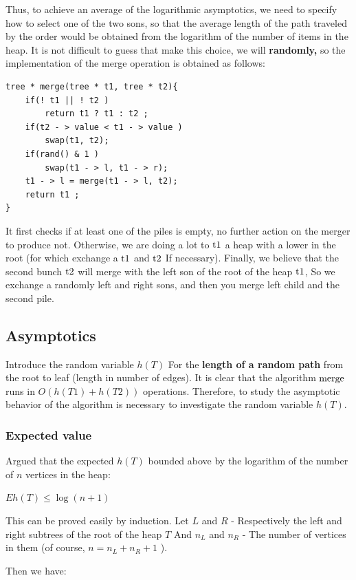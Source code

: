 Thus, to achieve an average of the logarithmic asymptotics, we need to specify how to select one of the two sons, so that the average length of the path traveled by the order would be obtained from the logarithm of the number of items in the heap. It is not difficult to guess that make this choice, we will \textbf{randomly,} so the implementation of the merge operation is obtained as follows:

\begin{verbatim}
tree * merge(tree * t1, tree * t2){
    if(! t1 || ! t2 )
        return t1 ? t1 : t2 ;
    if(t2 - > value < t1 - > value )
        swap(t1, t2);
    if(rand() & 1 )
        swap(t1 - > l, t1 - > r);
    t1 - > l = merge(t1 - > l, t2);
    return t1 ;
} 
\end{verbatim}
It first checks if at least one of the piles is empty, no further action on the merger to produce not. Otherwise, we are doing a lot to $\rm t1$ a heap with a lower in the root (for which exchange a $\rm t1$ and $\rm t2$ If necessary). Finally, we believe that the second bunch $\rm t2$ will merge with the left son of the root of the heap $\rm t1$, So we exchange a randomly left and right sons, and then you merge left child and the second pile.

\subsection{ Asymptotics }

Introduce the random variable $h (T)$ For the \textbf{length of a random path} from the root to leaf (length in number of edges). It is clear that the algorithm $\rm merge$ runs in $O (h (T1) + h (T2))$ operations. Therefore, to study the asymptotic behavior of the algorithm is necessary to investigate the random variable $h (T)$.

\subsubsection{ Expected value }

Argued that the expected $h (T)$ bounded above by the logarithm of the number of $n$ vertices in the heap:

$Eh (T) \le \log (n +1)$

This can be proved easily by induction. Let $L$ and $R$ - Respectively the left and right subtrees of the root of the heap $T$ And $n_L$ and $n_R$ - The number of vertices in them (of course, $n = n_L + n_R +1$ ).

Then we have:

